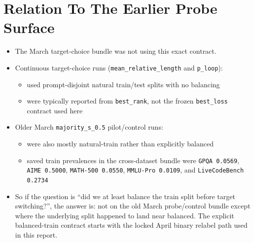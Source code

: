 \documentclass[11pt]{article}
\begin{document}
\section*{Relation To The Earlier Probe Surface}
\begin{itemize}[leftmargin=1.5em]
\item The March target-choice bundle was not using this exact contract.
\item Continuous target-choice runs (\texttt{mean\_relative\_length} and \texttt{p\_loop}):
  \begin{itemize}[leftmargin=1.5em]
  \item used prompt-disjoint natural train/test splits with no balancing
  \item were typically reported from \texttt{best\_rank}, not the frozen \texttt{best\_loss} contract used here
  \end{itemize}
\item Older March \texttt{majority\_s\_0.5} pilot/control runs:
  \begin{itemize}[leftmargin=1.5em]
  \item were also mostly natural-train rather than explicitly balanced
  \item saved train prevalences in the cross-dataset bundle were \texttt{GPQA 0.0569}, \texttt{AIME 0.5000}, \texttt{MATH-500 0.0550}, \texttt{MMLU-Pro 0.0109}, and \texttt{LiveCodeBench 0.2734}
  \end{itemize}
\item So if the question is ``did we at least balance the train split before target switching?'', the answer is: not on the old March probe/control bundle except where the underlying split happened to land near balanced. The explicit balanced-train contract starts with the locked April binary relabel path used in this report.
\end{itemize}
\end{document}
